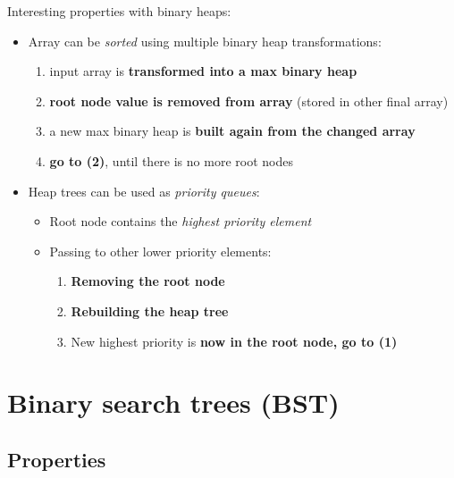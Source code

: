 \documentclass{beamer}[10pt, usepdftitle=false, handout]
\begin{document}
	\begin{frame}
	
	Interesting properties with binary heaps:
	
	\vspace*{1em}
	
	\begin{itemize}
		\item {Array can be \textit{sorted} using multiple binary heap transformations\footnotemark[4]:
			\begin{enumerate}
				\item {input array is \textbf{transformed into a max binary heap}}
				\item {\textbf{root node value is removed from array} (stored in other final array)}
				\item {a new max binary heap is \textbf{built again from the changed array}}
				\item {\textbf{go to (2)}, until there is no more root nodes}			
			\end{enumerate}				
		}	
		\item {Heap trees can be used as \textit{priority queues}: 
		\begin{itemize}
		\item {Root node contains the \textit{highest priority element}}
		\item {Passing to other lower priority elements: 
		\begin{enumerate}
			\item {\textbf{Removing the root node}}
			\item {\textbf{Rebuilding the heap tree}}
			\item {New highest priority is \textbf{now in the root node, go to (1)}}
		\end{enumerate}
		}
		\end{itemize}}
	\end{itemize}		
	
	
	\end{frame}		
	
	\section{Binary search trees (BST)}	
	\subsection{Properties}	
	
\end{document}
